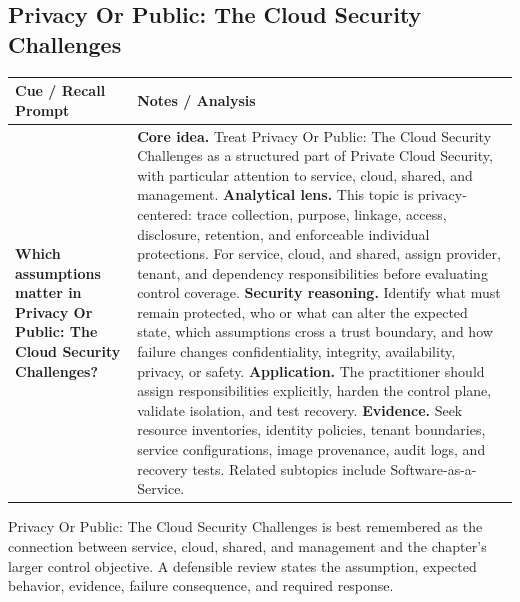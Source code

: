 \documentclass[11pt]{article}
\newcommand{\CornellHeader}{%
\rowcolor{Navy}\color{white}\bfseries Cue / Recall Prompt & \color{white}\bfseries Notes / Analysis\\\hline}
\newcommand{\CornellRow}[2]{%
\cellcolor{CueGray}\RaggedRight\textbf{#1} & \RaggedRight #2\\\hline}
\begin{document}
\subsection*{Privacy Or Public: The Cloud Security Challenges}
\begin{longtable}{>{\RaggedRight\arraybackslash}p{}|>{\RaggedRight\arraybackslash}p{}}
\CornellHeader
\CornellRow{Which assumptions matter in Privacy Or Public: The Cloud Security Challenges?}{\textbf{Core idea.} Treat Privacy Or Public: The Cloud Security Challenges as a structured part of Private Cloud Security, with particular attention to service, cloud, shared, and management. \textbf{Analytical lens.} This topic is privacy-centered: trace collection, purpose, linkage, access, disclosure, retention, and enforceable individual protections. For service, cloud, and shared, assign provider, tenant, and dependency responsibilities before evaluating control coverage. \textbf{Security reasoning.} Identify what must remain protected, who or what can alter the expected state, which assumptions cross a trust boundary, and how failure changes confidentiality, integrity, availability, privacy, or safety. \textbf{Application.} The practitioner should assign responsibilities explicitly, harden the control plane, validate isolation, and test recovery. \textbf{Evidence.} Seek resource inventories, identity policies, tenant boundaries, service configurations, image provenance, audit logs, and recovery tests. Related subtopics include Software-as-a-Service.}
\end{longtable}
\begin{topicsummary}
Privacy Or Public: The Cloud Security Challenges is best remembered as the connection between service, cloud, shared, and management and the chapter's larger control objective. A defensible review states the assumption, expected behavior, evidence, failure consequence, and required response.
\end{topicsummary}
\end{document}
